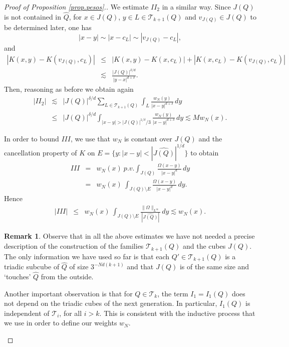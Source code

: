 \documentclass[11pt]{amsart}
\theoremstyle{definition}
\newtheorem*{xrem}{Remark}
\begin{document}
\begin{proof}[Proof of Proposition \ref{prop.pesos}.]
We estimate $I\!I_2$ in a  similar way. Since $J(Q)$ is not contained in $\widehat{Q}$, for $x\in J(Q)$, $y\in L \in {\mathcal T_{k+1}}(Q)$ and $v_{J(Q)}\in J(Q)$ to be determined later, one has
\[
|x-y|\sim |x-c_L|\sim |v_{J(Q)}-c_L|,
\]
and
\begin{eqnarray*}
|K(x,y)-K(v_{J(Q)},c_L)|&\leq& |K(x,y)-K(x,c_L)|+|K(x,c_L)-K(v_{J(Q)},c_L)| \\&\lesssim& \frac{|J(Q)|^{\delta/d}}{|y-x|^{d+\delta}}.
\end{eqnarray*}
Then, reasoning as before we obtain again
\begin{eqnarray*}
|I\!I_2|&\lesssim & |J(Q)|^{\delta/d} \sum_{L\in \mathcal T_{k+1}(Q)} \int_L \frac{w_N(y)}{|x-y|^{d+\delta}}\,dy\\&\leq& |J(Q)|^{\delta/d} \int_{|x-y|>|J(Q)|^{1/\delta}/3} \frac{w_N(y)}{|x-y|^{d+\delta}}\,dy \lesssim Mw_N(x).
\end{eqnarray*}

\bigskip

In order to bound $I\!I\!I$, we use that $w_N$ is constant over $J(Q)$ and the cancellation property of $K$ on $E=\{y:|x-y|<|\widehat{J(Q)}|^{1/d}\}$ to obtain
\begin{eqnarray}
I\!I\!I &=& w_N(x)\ p.v.\int_{J(Q)} \frac{\Omega(x-y)}{|x-y|^{d}}\,dy \nonumber\\&=& w_N(x)\ \int_{J(Q)\setminus E} \frac{\Omega(x-y)}{|x-y|^{d}}\,dy.\label{cancellation}
\end{eqnarray}
Hence
\begin{eqnarray*}
|I\!I\!I| &\leq & w_N(x)\ \int_{J(Q)\setminus E} \frac {\|\Omega\|_{L^\infty}} {|\widehat{J(Q)}|} \,dy \lesssim w_N(x).
\end{eqnarray*}

\bigskip

\begin{xrem} Observe that in all the above estimates we have not needed a precise description of the construction of the families ${\mathcal T_{k+1}}(Q)$ and the cubes $J(Q)$. The only information we have used so far is that each $Q' \in {\mathcal T_{k+1}}(Q)$ is a triadic subcube of $\widehat Q$ of size $3^{-Nd(k+1)}$ and that $J(Q)$ is of the same size and \lq touches' $\widehat Q$ from the outside.

Another important observation is that for $Q \in {\mathcal T_{k}}$, the term $I_1=I_1(Q)$ does not depend 
on the triadic cubes of the next generation. In particular, $I_1(Q)$ is independent of ${\mathcal T_{i}}$, for all $i>k$. This is consistent with the inductive process that we use in order to define our weights $w_N$.
\end{xrem}


\end{proof}
\end{document}
